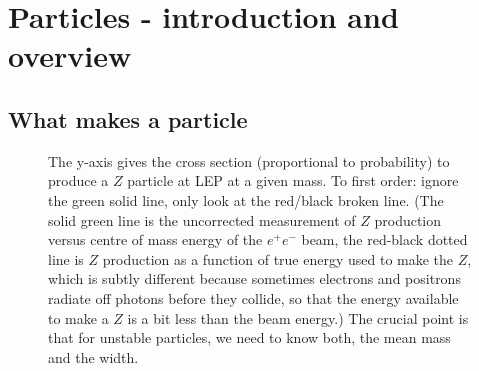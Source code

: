\section{Particles - introduction and overview}
\subsection{What makes a particle}
\begin{figure}
\caption{The y-axis gives the cross section (proportional to probability) to produce a $Z$ particle at LEP at a given mass. To first order: ignore the green solid line, only look at the red/black broken line. (The solid green line is the uncorrected measurement of $Z$ production versus centre of mass energy of the $e^+ e^-$ beam, the red-black dotted line is $Z$ production as a function of true energy used to make the $Z$, which is subtly different because sometimes electrons and positrons radiate off photons before they collide, so that the energy available to make a $Z$ is a bit less than the beam energy.) The crucial point is that for unstable particles, we need to know both, the mean mass and the width.\label{fig:z_lineshape}}
\end{figure}
